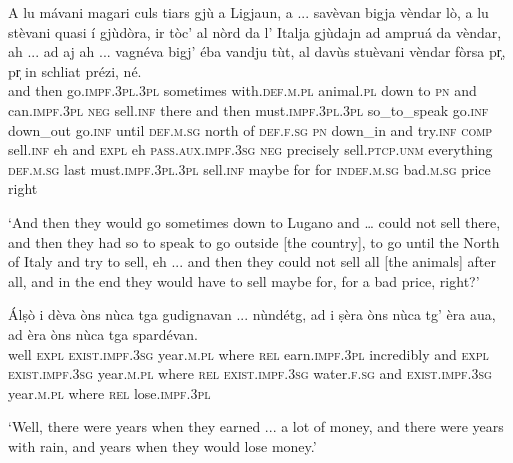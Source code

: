 \begin{linenumbers}
\gll A lu mávani magari culs tiars gjù a Ligjaun, a ... savèvan bigja vèndar lò, a lu stèvani quasi í gjùdòra, ir tòc’ al nòrd da l’ Italja gjùdajn ad ampruá da vèndar, ah ... ad aj ah ... vagnéva bigj’ éba vandju tùt, al davùs stuèvani vèndar fòrsa pr̩, pr̩ in schliat prézi, né.\\
and then go.\textsc{impf.3pl.3pl} sometimes with.\textsc{def.m.pl} animal.\textsc{pl} down to \textsc{pn} and {} can.\textsc{impf.3pl} \textsc{neg} sell.\textsc{inf} there and then must.\textsc{impf.3pl.3pl} so\_to\_speak go.\textsc{inf} down\_out go.\textsc{inf} until \textsc{def.m.sg} north of \textsc{def.f.sg} \textsc{pn} down\_in and try.\textsc{inf} \textsc{comp} sell.\textsc{inf} eh {} and \textsc{expl} eh {} \textsc{pass.aux.impf.3sg} \textsc{neg} precisely sell.\textsc{ptcp.unm} everything \textsc{def.m.sg} last must.\textsc{impf.3pl.3pl} sell.\textsc{inf} maybe for for \textsc{indef.m.sg} bad.\textsc{m.sg} price right \\
\end{linenumbers}
\medskip
\glt `And then they would go sometimes down to Lugano and … could not sell there, and then they had so to speak to go outside [the country], to go until the North of Italy and try to sell, eh ... and then they could not sell all [the animals] after all, and in the end they would have to sell maybe for, for a bad price, right?'
\medskip

\begin{linenumbers}
\gll Álṣò i dèva òns nùca tga gudignavan ... nùndétg, ad i ṣèra òns nùca tg’ èra aua, ad èra òns nùca tga spardévan.\\
well \textsc{expl} \textsc{exist.impf.3sg} year.\textsc{m.pl} where \textsc{rel} earn.\textsc{impf.3pl} {} incredibly and \textsc{expl} \textsc{exist.impf.3sg} year.\textsc{m.pl} where \textsc{rel} \textsc{exist.impf.3sg} water.\textsc{f.sg} and \textsc{exist.impf.3sg} year.\textsc{m.pl} where \textsc{rel} lose.\textsc{impf.3pl} \\
\end{linenumbers}
\medskip
\glt `Well, there were years when they earned ... a lot of money, and there were years with rain, and years when they would lose money.'
\medskip

